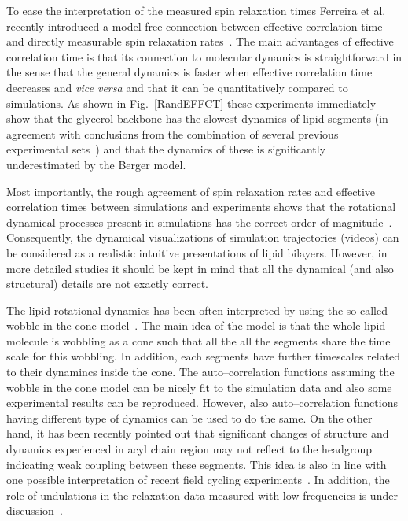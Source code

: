 \documentclass[aps,prl,superscriptaddress,twocolumn]{revtex4}
\begin{document}
To ease the interpretation of the measured spin relaxation times Ferreira et al. recently introduced a model
free connection between effective correlation time and directly measurable spin relaxation rates~\cite{ferreira15}.
The main advantages of effective correlation time is that its connection to molecular dynamics is straightforward in
the sense that the general dynamics is faster when effective correlation time decreases and {\it vice versa} and
that it can be quantitatively compared to simulations. As shown in Fig.~\ref{RandEFFCT} these experiments
immediately show that the glycerol backbone has the slowest dynamics of lipid segments (in agreement with conclusions from the
combination of several previous experimental sets~\cite{leftin11}) and that the dynamics
of these is significantly underestimated by the Berger model.

Most importantly, the rough agreement of spin relaxation rates and effective correlation times between 
simulations and experiments shows that the rotational dynamical processes present in simulations has the 
correct order of magnitude~\cite{pastor88,lindahl01,pastor02,klauda08a,klauda08b,wohlert06,feller02,eldho03,ollila07a,klauda08b,klauda12,ferreira15}. 
Consequently, the dynamical visualizations of simulation trajectories 
(videos) can be considered as a realistic intuitive presentations of lipid bilayers. However,
in more detailed studies it should be kept in mind that all the dynamical (and also structural) details
are not exactly correct. 

The lipid rotational dynamics has been often interpreted by using the so called wobble in the cone model~\cite{pastor88,pastor02,klauda08a,klauda08c,sivanandam09}.
The main idea of the model is that the whole lipid molecule is wobbling as a cone such that all the
all the segments share the time scale for this wobbling. In addition, each segments have further timescales
related to their dynamincs inside the cone. The auto--correlation functions assuming the wobble in the cone
model can be nicely fit to the simulation data and also some experimental results can be reproduced. 
However, also auto--correlation functions having different type of dynamics can be used to do the same.
On the other hand, it has been recently pointed out that significant changes of structure and dynamics 
experienced in acyl chain region may not reflect to the headgroup~\cite{ferreiraTHESIS,botan15} indicating weak coupling 
between these segments. This idea is also in line with one possible interpretation of recent field cycling experiments~\cite{roberts09}.
In addition, the role of undulations in the relaxation data measured with low frequencies is under discussion~\cite{leftin11,edholm08,klauda08a,klauda08c}.
\end{document}
